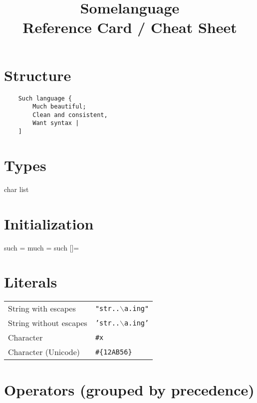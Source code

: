 \documentclass{refcard}
\title{Somelanguage\\Reference Card / Cheat Sheet}
\begin{document}
\maketitle

\section{Structure}

\begin{verbatim}
	Such language {
	    Much beautiful;
	    Clean and consistent,
	    Want syntax |
	]
\end{verbatim}

\section{Types}

\begin{ldesc}
	   {char   }
	   {list   }
\end{ldesc}

\section{Initialization}

\begin{ldesc}
	   { such  =           }
	  { much  =           }
	            { such  []= }
\end{ldesc}

\section{Literals}

\begin{tabular}{ll}
	String with escapes    & \texttt{"str..$\backslash{}$a.ing"} \\
	String without escapes & \texttt{'str..$\backslash{}$a.ing'} \\
	Character              & \texttt{\#x} \\
	Character (Unicode)    & \texttt{\#\{12AB56\}} \\
\end{tabular}

\section{Operators (grouped by precedence)}
\end{document}
